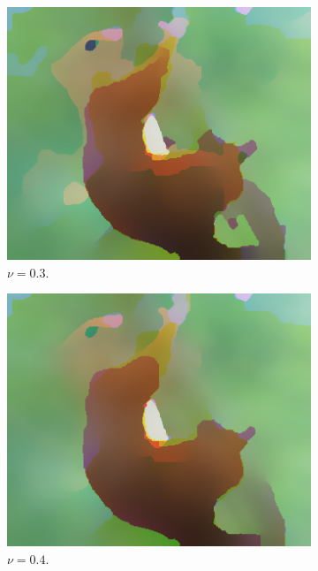 \documentclass[abstracton]{scrreprt}
\begin{document}
\begin{figure}[!ht]
\begin{subfigure}[b]{0.16\textwidth}
                    \includegraphics[width=\textwidth]{img/segmentation/rt/03squirrel.png}
                    \caption{$\nu = 0.3$.}
                \end{subfigure}
                \begin{subfigure}[b]{0.16\textwidth}
                    \includegraphics[width=\textwidth]{img/segmentation/rt/04squirrel.png}
                    \caption{$\nu = 0.4$.}
                \end{subfigure}
                \begin{subfigure}[b]{0.16\textwidth}

\end{subfigure}
\end{figure}
\end{document}
